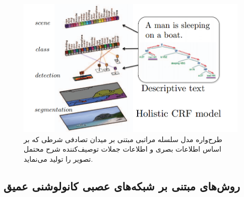 \begin{figure}[H]
\center
\includegraphics[scale=0.5]{./Imgs/fidler2013sentence_f1.png}
\caption{طرح‌واره مدل سلسله مراتبی مبتنی بر میدان تصادفی شرطی که بر اساس اطلاعات بصری و اطلاعات جملات توصیف‌کننده شرح محتمل تصویر را تولید می‌نماید\cite{fidler2013sentence}.}
\label{fig:F2013SF1}
\end{figure}
\subsection{روش‌های مبتنی بر شبکه‌های عصبی کانولوشنی عمیق}